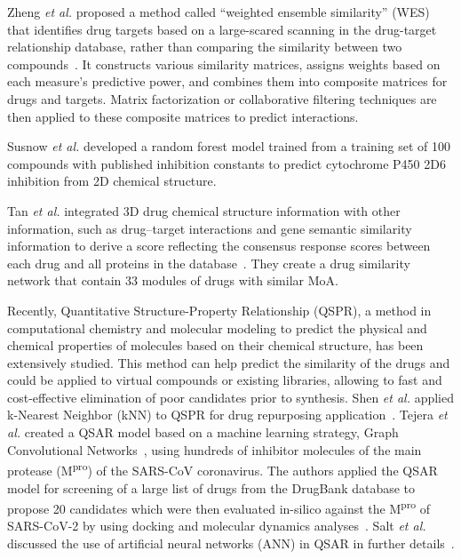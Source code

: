 Zheng \textit{et al.} proposed a method called ``weighted ensemble similarity'' (WES) that identifies drug targets based on a large-scared scanning in the drug-target relationship database, rather than comparing the similarity between two compounds~\cite{zheng2015large}.  It constructs various similarity matrices, assigns weights based on each measure’s predictive power, and combines them into composite matrices for drugs and targets. Matrix factorization or collaborative filtering techniques are then applied to these composite matrices to predict interactions. 

Susnow \textit{et al.} developed a random forest model trained from a training set of 100 compounds with published inhibition constants to predict cytochrome P450 2D6 inhibition from 2D chemical structure.

Tan \textit{et al.} integrated 3D drug chemical structure information with other information, such as drug–target interactions
and gene semantic similarity information to derive a score reflecting the consensus response scores between each drug and all proteins in the database~\cite{tan2014drug}. They create a drug similarity network that contain 33 modules of drugs with similar MoA.

Recently, Quantitative Structure-Property Relationship (QSPR), a method in computational chemistry and molecular modeling to predict the physical and chemical properties of molecules based on their chemical structure, has been extensively studied. This method can help predict the similarity of the drugs and could be applied to virtual compounds or
existing libraries, allowing to fast and cost-effective elimination of poor candidates prior to synthesis. Shen \textit{et al.} applied k-Nearest Neighbor (kNN) to QSPR for drug repurposing application~\cite{shen2003development}. Tejera \textit{et al.} created a QSAR model based on a machine learning strategy, Graph Convolutional Networks~\cite{duvenaud2015convolutional}, using hundreds of inhibitor molecules of the main protease (M\textsuperscript{pro}) of the SARS-CoV coronavirus. The authors applied the QSAR model for screening of a large list of drugs from the DrugBank database to propose 20 candidates which were then evaluated in-silico against the M\textsuperscript{pro} of SARS-CoV-2 by using docking and molecular dynamics analyses~\cite{tejera2020drugs}.
Salt \textit{et al.} discussed the use of artificial neural networks (ANN) in QSAR in further details~\cite{salt1992use}.




